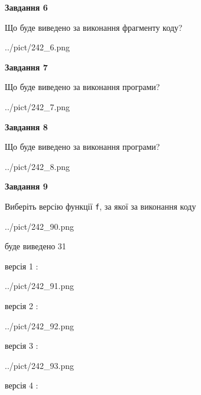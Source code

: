 \documentclass[12pt, ukrainian]{article}
\def\code#1{\Verb!#1!}
\begin{document}
{\begin {large}
{\begin {center}\textbf{Завдання 6}\end {center}}

Що буде виведено за виконання фрагменту коду?\par
\begin{center}
	{../pict/242_6.png}
\end{center}
\newpage

{\begin {center}\textbf{Завдання 7}\end {center}}

Що буде виведено за виконання програми?\par
\begin{center}
	{../pict/242_7.png}
\end{center}
\newpage

{\begin {center}\textbf{Завдання 8}\end {center}}

Що буде виведено за виконання програми?\par
\begin{center}
	{../pict/242_8.png}
\end{center}
\newpage

{\begin {center}\textbf{Завдання 9}\end {center}}

Виберіть версію функції \code{f}, за якої за виконання коду
\begin{center}
	{../pict/242_90.png}
\end{center}
буде виведено 31

\vspace{5mm}
версія 1 :

\begin{center}
	{../pict/242_91.png}
\end{center}
версія 2 :

\begin{center}
	{../pict/242_92.png}
\end{center}
версія 3 :

\begin{center}
	{../pict/242_93.png}
\end{center}
версія 4 :


\end{large}}
\end{document}
